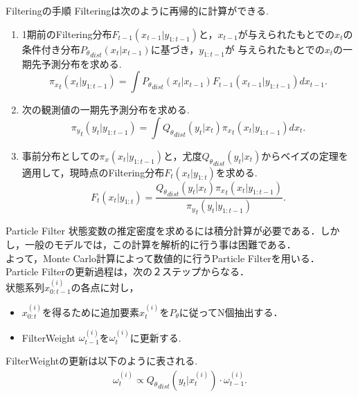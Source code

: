 \documentclass[dvipdfmx]{beamer}
\begin{document}
\begin{frame}{Filteringの手順}
Filteringは次のように再帰的に計算ができる.
\begin{enumerate}
 \item 1期前のFiltering分布$F_{t-1}(x_{t-1}|y_{1:t-1})$と，$x_{t-1}$が与えられたもとでの$x_t$の条件付き分布${P_\theta}_{dist}(x_t|x_{t-1})$に基づき，$y_{1:t-1}$が
与えられたもとでの$x_t$の一期先予測分布を求める.
\begin{equation*}
\label{eq:filter1}
{\pi_x}_{t}(x_t|y_{1:t-1})=\int {P_\theta}_{dist}(x_t|x_{t-1})F_{t-1}(x_{t-1}|y_{1:t-1})dx_{t-1}.
\end{equation*} 
 \item 次の観測値の一期先予測分布を求める.
\begin{equation*}
\label{eq:filter2}
{\pi_y}_t(y_t|y_{1:t-1})=\int {Q_\theta}_{dist}(y_t|x_t){\pi_x}_{t}(x_t|y_{1:t-1})dx_t.
\end{equation*}
 \item 事前分布としての$\pi_x(x_t|y_{1:t-1})$と，尤度${Q_\theta}_{dist}(y_t|x_t)$からベイズの定理を適用して，現時点のFiltering分布$F_t(x_t|y_{1:t})$を求める.
\begin{equation*}
F_t(x_t|y_{1:t})=\frac{{Q_\theta}_{dist}(y_t|x_t){\pi_x}_{t}(x_t|y_{1:t-1})}{{\pi_y}_t(y_t|y_{1:t-1})}.
\end{equation*}
\end{enumerate}
\end{frame}

\begin{frame}{Particle Filter}
状態変数の推定密度を求めるには積分計算が必要である．しかし，一般のモデルでは，この計算を解析的に行う事は困難である．\\
よって，Monte Carlo計算によって数値的に行うParticle Filterを用いる．\\
Particle Filterの更新過程は，次の２ステップからなる．\\
状態系列${x}^{(i)}_{0:t-1}$の各点に対し，
\begin{itemize}
\item ${x}^{(i)}_{0:t}$を得るために追加要素$x^{(i)}_t$を$P_\theta$に従ってN個抽出する．\\
\item FilterWeight $\omega_{t-1}^{(i)}$を$\omega_t^{(i)}$に更新する.\\
\end{itemize}
FilterWeightの更新は以下のように表される.
\begin{eqnarray*}
\omega^{(i)}_t\propto
{Q_\theta}_{dist}(y_t|x^{(i)}_t) \cdot  \omega^{(i)}_{t-1}.
\end{eqnarray*}
\end{frame}
\end{document}
